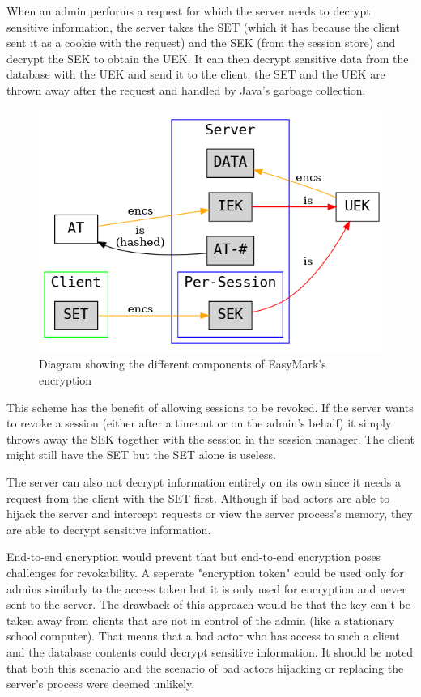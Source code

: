 \documentclass[12pt,a4paper,oneside]{report}
\begin{document}
	When an admin performs a request for which the server needs to decrypt sensitive information, the server takes the SET (which it has because the client sent it as a cookie with the request) and the SEK (from the session store) and decrypt the SEK to obtain the UEK. It can then decrypt sensitive data from the database with the UEK and send it to the client. the SET and the UEK are thrown away after the request and handled by Java's garbage collection.

	\begin{figure}[H]
		\centering
		\includegraphics[width=.7\textwidth]{easymark_encryption.png}
		\vskip0pt
		\caption{Diagram showing the different components of EasyMark's encryption}
	\end{figure}

	This scheme has the benefit of allowing sessions to be revoked. If the server wants to revoke a session (either after a timeout or on the admin's behalf) it simply throws away the SEK together with the session in the session manager. The client might still have the SET but the SET alone is useless.

	The server can also not decrypt information entirely on its own since it needs a request from the client with the SET first. Although if bad actors are able to hijack the server and intercept requests or view the server process's memory, they are able to decrypt sensitive information.

	End-to-end encryption would prevent that but end-to-end encryption poses challenges for revokability. A seperate "encryption token" could be used only for admins similarly to the access token but it is only used for encryption and never sent to the server. The drawback of this approach would be that the key can't be taken away from clients that are not in control of the admin (like a stationary school computer). That means that a bad actor who has access to such a client and the database contents could decrypt sensitive information. It should be noted that both this scenario and the scenario of bad actors hijacking or replacing the server's process were deemed unlikely.
\end{document}
